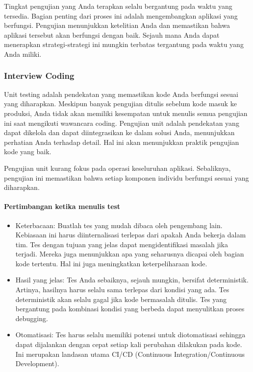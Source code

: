 \documentclass{article}
\begin{document}
Tingkat pengujian yang Anda terapkan selalu bergantung pada waktu yang tersedia. Bagian penting dari proses ini adalah mengembangkan aplikasi yang berfungsi. Pengujian menunjukkan ketelitian Anda dan memastikan bahwa aplikasi tersebut akan berfungsi dengan baik. Sejauh mana Anda dapat menerapkan strategi-strategi ini mungkin terbatas tergantung pada waktu yang Anda miliki.

\subsubsection{Interview Coding}
Unit testing adalah pendekatan yang memastikan kode Anda berfungsi sesuai yang diharapkan. Meskipun banyak pengujian ditulis sebelum kode masuk ke produksi, Anda tidak akan memiliki kesempatan untuk menulis semua pengujian ini saat mengikuti wawancara coding. Pengujian unit adalah pendekatan yang dapat dikelola dan dapat diintegrasikan ke dalam solusi Anda, menunjukkan perhatian Anda terhadap detail. Hal ini akan menunjukkan praktik pengujian kode yang baik.

Pengujian unit kurang fokus pada operasi keseluruhan aplikasi. Sebaliknya, pengujian ini memastikan bahwa setiap komponen individu berfungsi sesuai yang diharapkan.

\paragraph{Pertimbangan ketika menulis test}

\begin{itemize}
    \item Keterbacaan: Buatlah tes yang mudah dibaca oleh pengembang lain. Kebiasaan ini harus diinternalisasi terlepas dari apakah Anda bekerja dalam tim. Tes dengan tujuan yang jelas dapat mengidentifikasi masalah jika terjadi. Mereka juga menunjukkan apa yang seharusnya dicapai oleh bagian kode tertentu. Hal ini juga meningkatkan keterpeliharaan kode.
    \item Hasil yang jelas: Tes Anda sebaiknya, sejauh mungkin, bersifat deterministik. Artinya, hasilnya harus selalu sama terlepas dari kondisi yang ada. Tes deterministik akan selalu gagal jika kode bermasalah ditulis. Tes yang bergantung pada kombinasi kondisi yang berbeda dapat menyulitkan proses debugging.
    \item Otomatisasi: Tes harus selalu memiliki potensi untuk diotomatisasi sehingga dapat dijalankan dengan cepat setiap kali perubahan dilakukan pada kode. Ini merupakan landasan utama CI/CD (Continuous Integration/Continuous Development).
\end{itemize}
\end{document}

